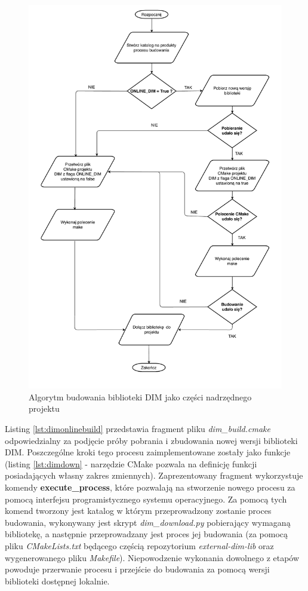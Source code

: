 \begin{figure}
\centering
\caption{Algorytm budowania biblioteki DIM jako części nadrzędnego projektu}
\label{fig:dimalgo}
\includegraphics[height=0.9\textheight]{res/DIMAlgo.pdf}
\end{figure}


Listing \ref{lst:dimonlinebuild} przedstawia fragment pliku \textit{dim\_build.cmake} odpowiedzialny za podjęcie próby pobrania i zbudowania nowej wersji biblioteki DIM. Poszczególne kroki tego procesu zaimplementowane zostały jako funkcje (listing \ref{lst:dimdown} - narzędzie CMake pozwala na definicję funkcji posiadających własny zakres zmiennych). Zaprezentowany fragment wykorzystuje komendy \textbf{execute\_process}, które pozwalają na stworzenie nowego procesu za pomocą interfejsu programistycznego systemu operacyjnego. Za pomocą tych komend tworzony jest katalog w którym przeprowadzony zostanie proces budowania, wykonywany jest skrypt \textit{dim\_download.py} pobierający wymaganą bibliotekę, a następnie przeprowadzany jest proces jej budowania (za pomocą pliku \textit{CMakeLists.txt} będącego częścią repozytorium \textit{external-dim-lib} oraz wygenerowanego pliku \textit{Makefile}). Niepowodzenie wykonania dowolnego z etapów powoduje przerwanie procesu i przejście do budowania za pomocą wersji biblioteki dostępnej lokalnie.


